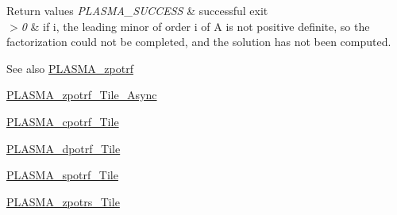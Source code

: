 \begin{DoxyRetVals}{Return values}
{\em P\+L\+A\+S\+M\+A\+\_\+\+S\+U\+C\+C\+E\+S\+S} & successful exit \\
\hline
{\em $>$0} & if i, the leading minor of order i of A is not positive definite, so the factorization could not be completed, and the solution has not been computed.\\
\hline
\end{DoxyRetVals}
\begin{DoxySeeAlso}{See also}
\hyperlink{group__PLASMA__Complex64__t_ga850a6c9da7c5632d160b28f211cdf2eb_ga850a6c9da7c5632d160b28f211cdf2eb}{P\+L\+A\+S\+M\+A\+\_\+zpotrf} 

\hyperlink{group__PLASMA__Complex64__t__Tile__Async_gaecab84c31c6e1658b18868b33478de53_gaecab84c31c6e1658b18868b33478de53}{P\+L\+A\+S\+M\+A\+\_\+zpotrf\+\_\+\+Tile\+\_\+\+Async} 

\hyperlink{group__PLASMA__Complex32__t__Tile_gaf651e550fd26664158610c8b8c8e5d00_gaf651e550fd26664158610c8b8c8e5d00}{P\+L\+A\+S\+M\+A\+\_\+cpotrf\+\_\+\+Tile} 

\hyperlink{group__double__Tile_ga6fde33d873bc6ad52b7c0c63ccc669ab_ga6fde33d873bc6ad52b7c0c63ccc669ab}{P\+L\+A\+S\+M\+A\+\_\+dpotrf\+\_\+\+Tile} 

\hyperlink{group__float__Tile_ga0518a079c049cdcd32b8ae408e0d5e28_ga0518a079c049cdcd32b8ae408e0d5e28}{P\+L\+A\+S\+M\+A\+\_\+spotrf\+\_\+\+Tile} 

\hyperlink{group__PLASMA__Complex64__t__Tile_gad13147593a1970092f560e8cb54925b8_gad13147593a1970092f560e8cb54925b8}{P\+L\+A\+S\+M\+A\+\_\+zpotrs\+\_\+\+Tile} 
\end{DoxySeeAlso}
\hypertarget{group__PLASMA__Complex64__t__Tile_ga30d9bbba83e9e9098c6444553d20f47a_ga30d9bbba83e9e9098c6444553d20f47a}{}
